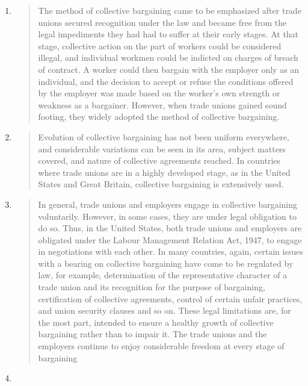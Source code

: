 \begin{enumerate}
\def\labelenumi{\arabic{enumi}.}
\item
  \begin{quote}
  The method of collective bargaining came to be emphasized after trade
  unions secured recognition under the law and became free from the
  legal impediments they had had to suffer at their early stages. At
  that stage, collective action on the part of workers could be
  considered illegal, and individual workmen could be indicted on
  charges of breach of contract. A worker could then bargain with the
  employer only as an individual, and the decision to accept or refuse
  the conditions offered by the employer was made based on the worker's
  own strength or weakness as a bargainer. However, when trade unions
  gained sound footing, they widely adopted the method of collective
  bargaining.
  \end{quote}
\item
  \begin{quote}
  Evolution of collective bargaining has not been uniform everywhere,
  and considerable variations can be seen in its area, subject matters
  covered, and nature of collective agreements reached. In countries
  where trade unions are in a highly developed stage, as in the United
  States and Great Britain, collective bargaining is extensively used.
  \end{quote}
\item
  \begin{quote}
  In general, trade unions and employers engage in collective bargaining
  voluntarily. However, in some cases, they are under legal obligation
  to do so. Thus, in the United States, both trade unions and employers
  are obligated under the Labour Management Relation Act, 1947, to
  engage in negotiations with each other. In many countries, again,
  certain issues with a bearing on collective bargaining have come to be
  regulated by law, for example, determination of the representative
  character of a trade union and its recognition for the purpose of
  bargaining, certification of collective agreements, control of certain
  unfair practices, and union security clauses and so on. These legal
  limitations are, for the most part, intended to ensure a healthy
  growth of collective bargaining rather than to impair it. The trade
  unions and the employers continue to enjoy considerable freedom at
  every stage of bargaining
  \end{quote}
\item

\end{enumerate}
